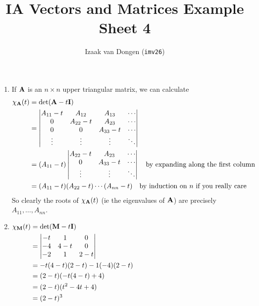 \documentclass[fleqn,a4paper,11pt]{article}
\title{IA Vectors and Matrices Example Sheet 4}
\author{Izaak van Dongen (\texttt{imv26})}
\begin{document}
 \maketitle\thispagestyle{empty} %

 \begin{enumerate}[label=\textbf{\arabic*.}]
  \item
   If \(\mathbf{A}\) is an \(n \times n\) upper triangular matrix, we can calculate
   \begin{align*}
    \chi_{\mathbf{A}}(t)
     &= \det(\mathbf{A} - t \mathbf{I}) \\
     &=
      \begin{vmatrix}
       A_{11} - t & A_{12} & A_{13} & \dotsm \\
       0 & A_{22} - t & A_{23} & \dotsm \\
       0 & 0 & A_{33} - t & \dotsm \\
       \vdots & \vdots & \vdots & \ddots
      \end{vmatrix} \\
     &=
      (A_{11} - t)
      \begin{vmatrix}
       A_{22} - t & A_{23} & \dotsm \\
       0 & A_{33} - t & \dotsm \\
       \vdots & \vdots & \ddots
      \end{vmatrix} \quad \text{by expanding along the first column} \\
     &= (A_{11} - t)(A_{22} - t) \dotsm (A_{nn} - t)
      \quad \text{by induction on \(n\) if you really care}
   \end{align*}
   So clearly the roots of \(\chi_{\mathbf{A}}(t)\) (ie the eigenvalues of
   \(\mathbf{A}\)) are precisely \(A_{11}, \dotsc, A_{nn}\).
  \item \(
   \begin{aligned}[t]
    \chi_{\mathbf{M}}(t)
     &= \det(\mathbf{M} - t \mathbf{I}) \\
     &=
     \begin{vmatrix}
      -t & 1 & 0 \\
      -4 & 4 - t & 0 \\
      -2 & 1 & 2 - t
     \end{vmatrix} \\
     &= -t(4 - t)(2 - t) - 1(-4)(2 - t) \\
     &= (2 - t)( -t(4 - t) + 4) \\
     &= (2 - t)(t^2 - 4t + 4) \\
     &= (2 - t)^3
   \end{aligned} \)


\end{enumerate}
\end{document}
